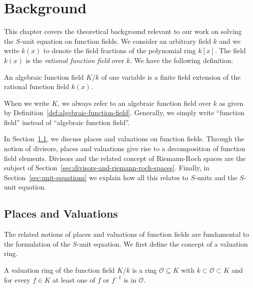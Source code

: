 
\chapter{Background}%
\label{chap:background}

This chapter covers the theoretical background relevant to our work on solving the \(S\)-unit equation on function fields. We consider an arbitrary field \(k\) and we write \(k(x)\) to denote the field fractions of the polynomial ring \(k[x]\). The field \(k(x)\) is the \textit{rational function field} over \(k\). We have the following definition.

\begin{definition}%
  \label{def:algebraic-function-field}
  An algebraic function field \(K / k\) of one variable is a finite field extension of the rational function field \(k(x)\).
\end{definition}

When we write \(K\), we always refer to an algebraic function field over \(k\) as given by Definition~\ref{def:algebraic-function-field}. Generally, we simply write ``function field'' instead of ``algebraic function field''.

In Section~\ref{sec:places-and-valuations}, we discuss places and valuations on function fields. Through the notion of divisors, places and valuations give rise to a decomposition of function field elements. Divisors and the related concept of Riemann-Roch spaces are the subject of Section~\ref{sec:divisors-and-riemann-roch-spaces}. Finally, in Section~\ref{sec:unit-equations} we explain how all this relates to \(S\)-units and the \(S\)-unit equation.

\section{Places and Valuations}%
\label{sec:places-and-valuations}

The related notions of places and valuations of function fields are fundamental to the formulation of the \(S\)-unit equation. We first define the concept of a valuation ring.

\begin{definition}%
  \label{def:valuation-ring}
  A valuation ring of the function field \(K / k\) is a ring \(\mathcal{O} \subseteq K\) with \(k \subset \mathcal{O} \subset K\) and for every \(f \in K\) at least one of \(f\) or \(f^{-1}\) is in \(\mathcal{O}\).
\end{definition}

